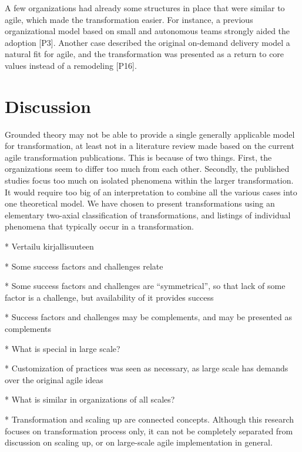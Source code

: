 
A few organizations had already some structures in place that were similar to
agile, which made the transformation easier.
For instance, a previous organizational model based on small and autonomous
teams strongly aided the adoption [P3].
Another case described the original on-demand delivery model a natural fit for
agile, and the transformation was presented as a return to core values instead
of a remodeling [P16].


\clearpage

\section{Discussion}
\label{sec:discussion}

Grounded theory may not be able to provide a single generally applicable model
for transformation, at least not in a literature review made based on the
current agile transformation publications. This is because of two things.
First, the organizations seem to differ too much from each other. Secondly, the
published studies focus too much on isolated phenomena within the larger
transformation.
It would require too big of an interpretation to combine all the various cases
into one theoretical model. We have chosen to present transformations using an
elementary two-axial classification of transformations, and listings of
individual phenomena that typically occur in a transformation.

* Vertailu kirjallisuuteen

* Some success factors and challenges relate

* Some success factors and challenges are ``symmetrical'', so that lack of some
  factor is a challenge, but availability of it provides success

* Success factors and challenges may be complements, and may be presented as
  complements

* What is special in large scale?

* Customization of practices was seen as necessary, as large scale has demands
  over the original agile ideas

* What is similar in organizations of all scales?

* Transformation and scaling up are connected concepts. Although this research
  focuses on transformation process only, it can not be completely separated
  from discussion on scaling up, or on large-scale agile implementation in
  general.

